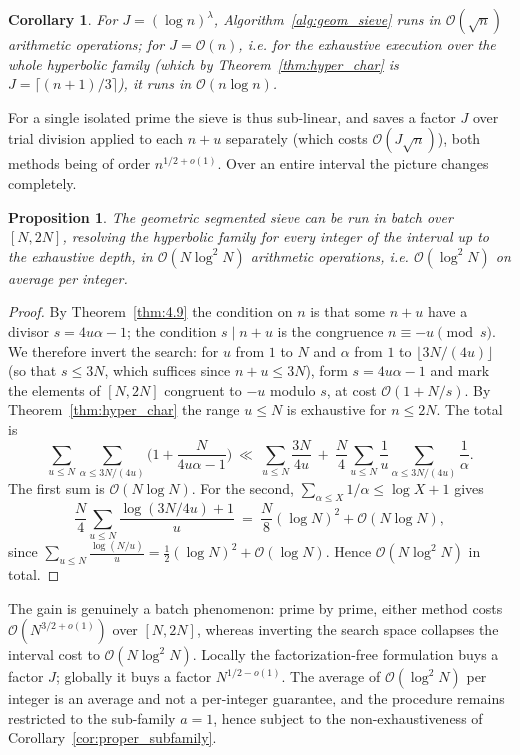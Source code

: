 \documentclass[11pt, a4paper]{article}
\theoremstyle{plain}
\newtheorem{corollary}[theorem]{Corollary}
\newtheorem{proposition}[theorem]{Proposition}
\theoremstyle{definition}
\begin{document}
\begin{corollary} \label{cor:4.12}
For $J=(\log n)^{\lambda}$, Algorithm~\ref{alg:geom_sieve} runs in $\mathcal{O}(\sqrt n)$ arithmetic operations; for $J=\mathcal{O}(n)$, i.e. for the exhaustive execution over the whole hyperbolic family (which by Theorem~\ref{thm:hyper_char} is $J=\lceil(n+1)/3\rceil$), it runs in $\mathcal{O}(n\log n)$.
\end{corollary}

For a single isolated prime the sieve is thus sub-linear, and saves a factor $J$ over trial division applied to each $n+u$ separately (which costs $\mathcal{O}(J\sqrt n)$), both methods being of order $n^{1/2+o(1)}$. Over an entire interval the picture changes completely.

\begin{proposition} \label{prop:batch_sieve}
The geometric segmented sieve can be run in batch over $[N,2N]$, resolving the hyperbolic family for every integer of the interval up to the exhaustive depth, in $\mathcal{O}(N \log^2 N)$ arithmetic operations, i.e. $\mathcal{O}(\log^{2}N)$ on average per integer.
\end{proposition}
\begin{proof}
By Theorem~\ref{thm:4.9} the condition on $n$ is that some $n+u$ have a divisor $s=4u\alpha-1$; the condition $s\mid n+u$ is the congruence $n\equiv-u\pmod s$. We therefore invert the search: for $u$ from $1$ to $N$ and $\alpha$ from $1$ to $\lfloor 3N/(4u)\rfloor$ (so that $s\le 3N$, which suffices since $n+u\le 3N$), form $s=4u\alpha-1$ and mark the elements of $[N,2N]$ congruent to $-u$ modulo $s$, at cost $\mathcal{O}(1+N/s)$. By Theorem~\ref{thm:hyper_char} the range $u\le N$ is exhaustive for $n\le2N$. The total is
$$\sum_{u\le N} \sum_{\alpha\le 3N/(4u)}\Big(1+\frac{N}{4u\alpha-1}\Big)\ \ll\ \sum_{u\le N}\frac{3N}{4u}\ +\ \frac{N}{4}\sum_{u\le N}\frac{1}{u}\sum_{\alpha\le 3N/(4u)}\frac1\alpha .$$
The first sum is $\mathcal{O}(N\log N)$. For the second, $\sum_{\alpha\le X}1/\alpha\le\log X+1$ gives
$$\frac{N}{4}\sum_{u\le N}\frac{\log(3N/4u)+1}{u}\ =\ \frac{N}{8}(\log N)^{2}+\mathcal{O}(N\log N),$$
since $\sum_{u\le N}\frac{\log(N/u)}{u}=\frac12(\log N)^{2}+\mathcal{O}(\log N)$. Hence $\mathcal{O}(N\log^{2}N)$ in total.
\end{proof}

The gain is genuinely a batch phenomenon: prime by prime, either method costs $\mathcal{O}(N^{3/2+o(1)})$ over $[N,2N]$, whereas inverting the search space collapses the interval cost to $\mathcal{O}(N\log^{2}N)$. Locally the factorization-free formulation buys a factor $J$; globally it buys a factor $N^{1/2-o(1)}$. The average of $\mathcal{O}(\log^{2}N)$ per integer is an average and not a per-integer guarantee, and the procedure remains restricted to the sub-family $a=1$, hence subject to the non-exhaustiveness of Corollary~\ref{cor:proper_subfamily}.
\end{document}

